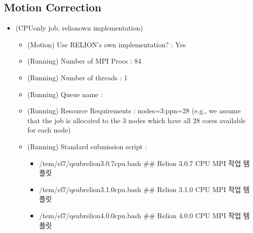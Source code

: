 \documentclass[a4paper,10pt,english]{sphinxmanual}
\begin{document}
\subsection{Motion Correction}
\label{\detokenize{relion:motion-correction}}\begin{itemize}
\item {} 
\sphinxAtStartPar
{} (CPU\sphinxhyphen{}only job, relion\sphinxhyphen{}own implementation)
\begin{itemize}
\item {} 
\sphinxAtStartPar
(Motion) Use RELION’s own implementation? : Yes

\item {} 
\sphinxAtStartPar
(Running) Number of MPI Procs : 84

\item {} 
\sphinxAtStartPar
(Running) Number of threads : 1

\item {} 
\sphinxAtStartPar
(Running) Queue name : 

\item {} 
\sphinxAtStartPar
(Running) Resource Requirements : nodes=3:ppn=28  (e.g., we assume that the job is allocated to the 3 nodes which have all 28 cores available for each node)

\item {} 
\sphinxAtStartPar
(Running) Standard submission script :
\begin{itemize}
\item {} 
\sphinxAtStartPar
/tem/el7/qsub\sphinxhyphen{}relion\sphinxhyphen{}3.0.7\sphinxhyphen{}cpu.bash           \#\# Relion 3.0.7 CPU MPI 작업 템플릿

\item {} 
\sphinxAtStartPar
/tem/el7/qsub\sphinxhyphen{}relion\sphinxhyphen{}3.1.0\sphinxhyphen{}cpu.bash           \#\# Relion 3.1.0 CPU MPI 작업 템플릿

\item {} 
\sphinxAtStartPar
/tem/el7/qsub\sphinxhyphen{}relion\sphinxhyphen{}4.0.0\sphinxhyphen{}cpu.bash           \#\# Relion 4.0.0 CPU MPI 작업 템플릿

\end{itemize}

\end{itemize}

\end{itemize}

\end{document}
